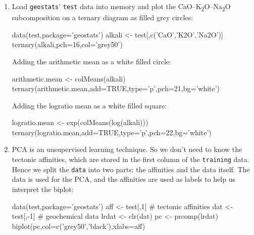 \begin{enumerate}
\item\label{it:sol-ternary-test} Load \texttt{geostats}' \texttt{test}
  data into memory and plot the
  CaO--K\textsubscript{2}O--Na\textsubscript{2}O subcomposition on a
  ternary diagram as filled grey circles:

\begin{script}
data(test,package='geostats')
alkali <- test[,c('CaO','K2O','Na2O')]
ternary(alkali,pch=16,col='grey50')
\end{script}

Adding the arithmetic mean as a white filled circle:

\begin{script}[firstnumber=4]
arithmetic.mean <- colMeans(alkali)
ternary(arithmetic.mean,add=TRUE,type='p',pch=21,bg='white')
\end{script}

Adding the logratio mean as a white filled square:

\begin{script}[firstnumber=6]
logratio.mean <- exp(colMeans(log(alkali)))
ternary(logratio.mean,add=TRUE,type='p',pch=22,bg='white')
\end{script}

\item PCA is an unsupervised learning technique. So we don't need to
  know the tectonic affinities, which are stored in the first column
  of the \texttt{training} data. Hence we split the \texttt{data} into
  two parts: the affinities and the data itself. The data is used for
  the PCA, and the affinities are used as labels to help us interpret
  the biplot:

\begin{script}
data(test,package='geostats')
aff <- test[,1]      # tectonic affinities
dat <- test[,-1]     # geochemical data
lrdat <- clr(dat)
pc <- prcomp(lrdat)
biplot(pc,col=c('grey50','black'),xlabs=aff)
\end{script}


\end{enumerate}
